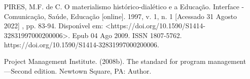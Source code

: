 \documentclass[
12pt,		%
openright,	%
twoside,  %
a4paper,			%
chapter=TITLE,		%
english,			%
french,				%
spanish,			%
brazil				%
]{USPSC-classe/USPSC}
\begin{document}
\begin{flushleft}
\begin{flushleft}
\begin{flushleft}
\begin{flushleft}
\begin{flushleft}
\begin{flushleft}
\begin{flushleft}
\begin{flushleft}
\begin{flushleft}
[PIRES, 2009] PIRES, M.F. de C. O materialismo hist\'orico-dial\'etico e a Educa\c{c}\~ao. Interface - Comunica\c{c}\~ao, Sa\'ude, Educa\c{c}\~ao [online]. 1997, v. 1, n. 1 [Acessado 31 Agosto 2022] , pp. 83-94. Dispon\'{\i}vel em: <https://doi.org/10.1590/S1414-32831997000200006>. Epub 04 Ago 2009. ISSN 1807-5762. https://doi.org/10.1590/S1414-32831997000200006.
\end{flushleft}


\end{flushleft}


\end{flushleft}


\end{flushleft}


\end{flushleft}


\end{flushleft}


\end{flushleft}


\end{flushleft}


\end{flushleft}


\begin{flushleft}
\begin{flushleft}
\begin{flushleft}
\begin{flushleft}
\begin{flushleft}
\begin{flushleft}
\begin{flushleft}
\begin{flushleft}
\begin{flushleft}
[PMI, 2008] Project Management Institute. (2008b). The standard for program management—Second edition. Newtown Square, PA: Author.
\end{flushleft}


\end{flushleft}


\end{flushleft}


\end{flushleft}


\end{flushleft}


\end{flushleft}


\end{flushleft}


\end{flushleft}


\end{flushleft}
\end{document}
